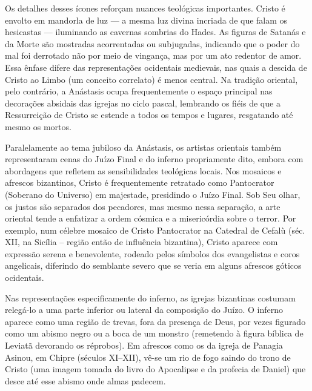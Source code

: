 Os detalhes desses ícones reforçam nuances teológicas importantes. Cristo é envolto em mandorla de luz --- a mesma luz divina incriada de que falam os hesicastas --- iluminando as cavernas sombrias do Hades. As figuras de Satanás e da Morte são mostradas acorrentadas ou subjugadas, indicando que o poder do mal foi derrotado não por meio de vingança, mas por um ato redentor de amor. Essa ênfase difere das representações ocidentais medievais, nas quais a descida de Cristo ao Limbo (um conceito correlato) é menos central. Na tradição oriental, pelo contrário, a Anástasis ocupa frequentemente o espaço principal nas decorações absidais das igrejas no ciclo pascal, lembrando os fiéis de que a Ressurreição de Cristo se estende a todos os tempos e lugares, resgatando até mesmo os mortos.



Paralelamente ao tema jubiloso da Anástasis, os artistas orientais também representaram cenas do Juízo Final e do inferno propriamente dito, embora com abordagens que refletem as sensibilidades teológicas locais. Nos mosaicos e afrescos bizantinos, Cristo é frequentemente retratado como Pantocrator (Soberano do Universo) em majestade, presidindo o Juízo Final. Sob Seu olhar, os justos são separados dos pecadores, mas mesmo nessa separação, a arte oriental tende a enfatizar a ordem cósmica e a misericórdia sobre o terror. Por exemplo, num célebre mosaico de Cristo Pantocrator na Catedral de Cefalù (séc. XII, na Sicília -- região então de influência bizantina), Cristo aparece com expressão serena e benevolente, rodeado pelos símbolos dos evangelistas e coros angelicais, diferindo do semblante severo que se veria em alguns afrescos góticos ocidentais.

Nas representações especificamente do inferno, as igrejas bizantinas costumam relegá-lo a uma parte inferior ou lateral da composição do Juízo. O inferno aparece como uma região de trevas, fora da presença de Deus, por vezes figurado como um abismo negro ou a boca de um monstro (remetendo à figura bíblica de Leviatã devorando os réprobos). Em afrescos como os da igreja de Panagia Asinou, em Chipre (séculos XI--XII), vê-se um rio de fogo saindo do trono de Cristo (uma imagem tomada do livro do Apocalipse e da profecia de Daniel) que desce até esse abismo onde almas padecem.

